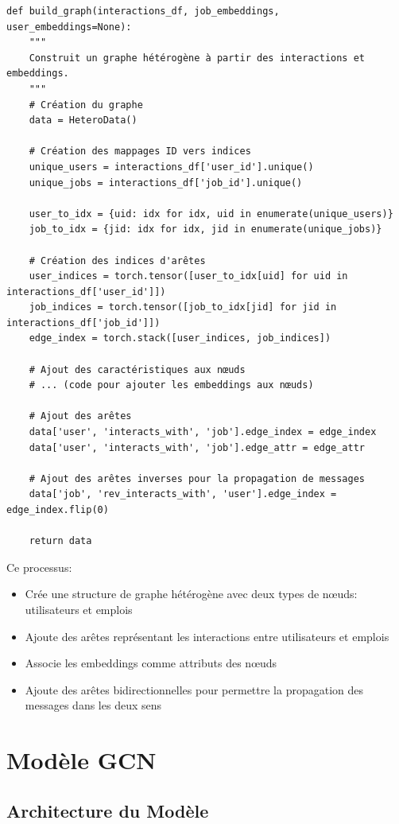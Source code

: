 \documentclass[12pt,a4paper]{article}
\begin{document}
\begin{lstlisting}[caption=Construction du graphe hétérogène]
def build_graph(interactions_df, job_embeddings, user_embeddings=None):
    """
    Construit un graphe hétérogène à partir des interactions et embeddings.
    """
    # Création du graphe
    data = HeteroData()
    
    # Création des mappages ID vers indices
    unique_users = interactions_df['user_id'].unique()
    unique_jobs = interactions_df['job_id'].unique()
    
    user_to_idx = {uid: idx for idx, uid in enumerate(unique_users)}
    job_to_idx = {jid: idx for idx, jid in enumerate(unique_jobs)}
    
    # Création des indices d'arêtes
    user_indices = torch.tensor([user_to_idx[uid] for uid in interactions_df['user_id']])
    job_indices = torch.tensor([job_to_idx[jid] for jid in interactions_df['job_id']])
    edge_index = torch.stack([user_indices, job_indices])
    
    # Ajout des caractéristiques aux nœuds
    # ... (code pour ajouter les embeddings aux nœuds)
    
    # Ajout des arêtes
    data['user', 'interacts_with', 'job'].edge_index = edge_index
    data['user', 'interacts_with', 'job'].edge_attr = edge_attr
    
    # Ajout des arêtes inverses pour la propagation de messages
    data['job', 'rev_interacts_with', 'user'].edge_index = edge_index.flip(0)
    
    return data
\end{lstlisting}

Ce processus:
\begin{itemize}
    \item Crée une structure de graphe hétérogène avec deux types de nœuds: utilisateurs et emplois
    \item Ajoute des arêtes représentant les interactions entre utilisateurs et emplois
    \item Associe les embeddings comme attributs des nœuds
    \item Ajoute des arêtes bidirectionnelles pour permettre la propagation des messages dans les deux sens
\end{itemize}

\section{Modèle GCN}
\subsection{Architecture du Modèle}
\end{document}
